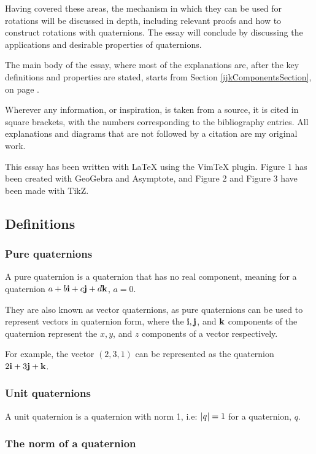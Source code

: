\documentclass[10pt]{article}
\begin{document}
Having covered these areas, the mechanism in which they can be used for rotations will be discussed in depth, including relevant proofs and how to construct rotations with quaternions. The essay will conclude by discussing the applications and desirable properties of quaternions.

The main body of the essay, where most of the explanations are, after the key definitions and properties are stated, starts from Section \ref{ijkComponentsSection}, on page \pageref{ijkComponentsSection}.

Wherever any information, or inspiration, is taken from a source, it is cited in square brackets, with the numbers corresponding to the bibliography entries. All explanations and diagrams that are not followed by a citation are my original work.

This essay has been written with \LaTeX{} using the VimTeX plugin. Figure 1 has been created with GeoGebra and Asymptote, and Figure 2 and Figure 3 have been made with TikZ.

\subsection{Definitions}

\subsubsection{Pure quaternions} \label{PureDef}

A pure quaternion is a quaternion that has no real component, meaning for a quaternion $a + b\vb{i} + c\vb{j} + d\vb{k}$, $a = 0$. \cite{Math431}

They are also known as vector quaternions, as pure quaternions can be used to represent vectors in quaternion form, where the $\vb{i, j}$, and $\vb{k}$ components of the quaternion represent the $x, y$, and $z$ components of a vector respectively.

For example, the vector $(2,3,1)$ can be represented as the quaternion $2\vb{i} + 3\vb{j} + \vb{k}$.

\subsubsection{Unit quaternions}

A unit quaternion is a quaternion with norm 1, i.e: $\abs{q} = 1$ for a quaternion, $q$. \cite{DRose}

\subsubsection{The norm of a quaternion}
\end{document}
